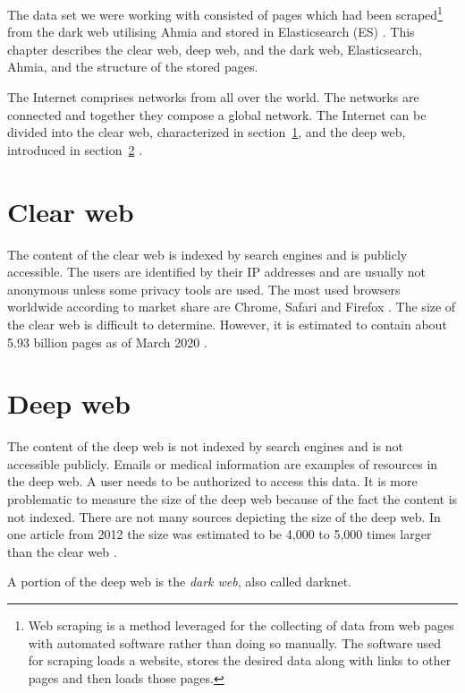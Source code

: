 \label{datasetAnalysis}
The data set we were working with consisted of pages which had been scraped\footnote{Web scraping is a method leveraged for the collecting of data from web pages with automated software rather than doing so manually. The software used for scraping loads a website, stores the desired data along with links to other pages and then loads those pages.} from the dark web utilising Ahmia \cite{ahmia} and stored in Elasticsearch (ES) \cite{elasticSearch} \cite{bcScraping}. This chapter describes the clear web, deep web, and the dark web, Elasticsearch, Ahmia, and the structure of the stored pages.

The Internet comprises networks from all over the world. The networks are connected and together they compose a global network. The Internet can be divided into the clear web, characterized in section~\ref{clearWeb}, and the deep web, introduced in section~\ref{deepWeb} \cite{internetStructure}.

\section{Clear web} \label{clearWeb}
The content of the clear web is indexed by search engines and is publicly accessible. The users are identified by their IP addresses and are usually not anonymous unless some privacy tools are used. The most used browsers worldwide according to market share are Chrome, Safari and Firefox \cite{browserMarketShare}. The size of the clear web is difficult to determine. However, it is estimated to contain about 5.93 billion pages as of March 2020 \cite{clearWebSize}.

\section{Deep web} \label{deepWeb}
The content of the deep web is not indexed by search engines and is not accessible publicly. Emails or medical information are examples of resources in the deep web. A user needs to be authorized to access this data. It is more problematic to measure the size of the deep web because of the fact the content is not indexed. There are not many sources depicting the size of the deep web. In one article from 2012 the size was estimated to be 4,000 to 5,000 times larger than the clear web \cite{deepWebSize}. 

A portion of the deep web is the \textit{dark web}, also called darknet. 

